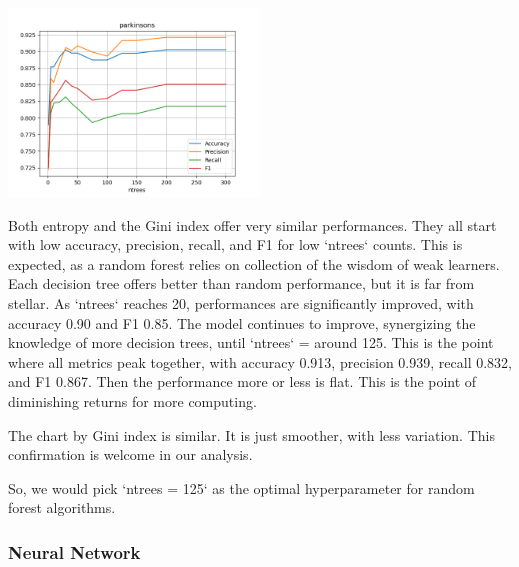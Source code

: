 \includegraphics[width=0.5\textwidth]{./figures/rf_parkinsons_gini.png}

Both entropy and the Gini index offer very similar performances. They all start with low accuracy, precision, recall, and F1  for low `ntrees` counts. This is expected, as a random forest relies on collection of the wisdom of weak learners. Each decision tree offers better than random performance, but it is far from stellar. As `ntrees` reaches 20, performances are significantly improved, with accuracy 0.90 and F1 0.85. The model continues to improve, synergizing the knowledge of more decision trees, until `ntrees` = around 125. This is the point where all metrics peak together, with accuracy 0.913, precision 0.939, recall 0.832, and F1 0.867. Then the performance more or less is flat. This is the point of diminishing returns for more computing. 

The chart by Gini index is similar. It is just smoother, with less variation. This confirmation is welcome in our analysis.

So, we would pick `ntrees = 125` as the optimal hyperparameter for random forest algorithms. 


\newpage

\subsubsection{Neural Network}

